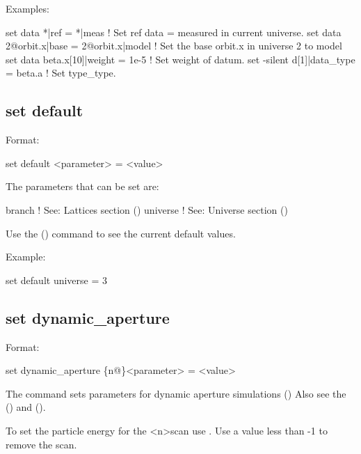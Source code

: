 {{Examples:
\begin{example}
  set data *|ref = *|meas              ! Set ref data = measured in current universe.
  set data 2@orbit.x|base = 2@orbit.x|model 
                                       ! Set the base orbit.x in universe 2 to model
  set data beta.x[10]|weight = 1e-5    ! Set weight of datum.
  set -silent d[1]|data_type = beta.a  ! Set type_type.
\end{example}


\subsection{set default}
\label{s:set.default}

Format:
\begin{example}
  set default <parameter> = <value>
\end{example}

The parameters that can be set are:
\begin{example}
  branch            ! See: Lattices section ()
  universe          ! See: Universe section ()
\end{example}

Use the  () command to see the current
default values.

Example:
\begin{example}
  set default universe = 3
\end{example}


\subsection{set dynamic_aperture}
\label{s:set.da}

Format:
\begin{example}
  set dynamic_aperture \{n@\}<parameter> = <value>
\end{example}

The  command sets parameters for dynamic aperture simulations
() Also see the  () and
 ().

To set the particle energy for the <n>\Th scan use . Use a value less than -1 to remove
the scan.

}}
